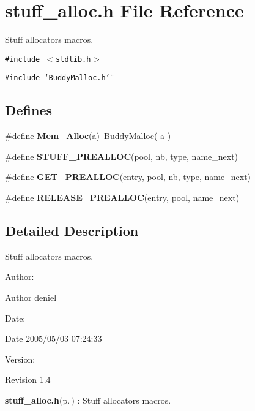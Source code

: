 \section{stuff\_\-alloc.h File Reference}
\label{stuff__alloc_8h}
Stuff allocators macros. 

{\tt \#include $<$stdlib.h$>$}\par
{\tt \#include \char`\"{}Buddy\-Malloc.h\char`\"{}}\par
\subsection*{Defines}
\begin{CompactItemize}
\item 
\#define {\bf Mem\_\-Alloc}(a)\ Buddy\-Malloc( a )
\item 
\#define {\bf STUFF\_\-PREALLOC}(pool, nb, type, name\_\-next)
\item 
\#define {\bf GET\_\-PREALLOC}(entry, pool, nb, type, name\_\-next)
\item 
\#define {\bf RELEASE\_\-PREALLOC}(entry, pool, name\_\-next)
\end{CompactItemize}


\subsection{Detailed Description}
Stuff allocators macros. 

\begin{Desc}
\item[Author:]\begin{Desc}
\item[Author]deniel \end{Desc}
\end{Desc}
\begin{Desc}
\item[Date:]\begin{Desc}
\item[Date]2005/05/03 07:24:33 \end{Desc}
\end{Desc}
\begin{Desc}
\item[Version:]\begin{Desc}
\item[Revision]1.4 \end{Desc}
\end{Desc}
{\bf stuff\_\-alloc.h}{\rm (p.\,\pageref{stuff__alloc_8h})} : Stuff allocators macros.

